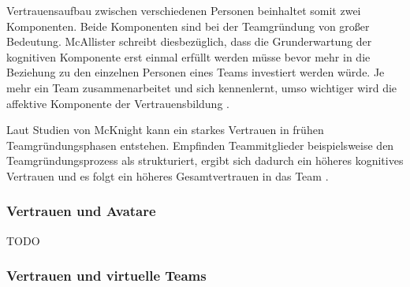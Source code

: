 \documentclass[a4paper,11pt]{article}%
\renewcommand{\\}{\vspace*{0.5\baselineskip} \newline}
\begin{document}
Vertrauensaufbau zwischen verschiedenen Personen beinhaltet somit zwei Komponenten. Beide Komponenten sind bei der Teamgründung von großer Bedeutung. 
McAllister schreibt diesbezüglich, dass die Grunderwartung der kognitiven Komponente erst einmal erfüllt werden müsse bevor mehr in die Beziehung zu den einzelnen Personen eines Teams investiert werden würde. Je mehr ein Team zusammenarbeitet und sich kennenlernt, umso wichtiger wird die affektive Komponente der Vertrauensbildung \citep[p.30]{mcallister1995affect}.

Laut Studien von McKnight kann ein starkes Vertrauen in frühen Teamgründungsphasen entstehen. Empfinden Teammitglieder beispielsweise den Teamgründungsprozess als strukturiert, ergibt sich dadurch ein höheres kognitives Vertrauen und es folgt ein höheres Gesamtvertrauen in das Team \citep[p.478-479]{mcknight1998initial}.




\subsubsection{Vertrauen und Avatare}
TODO
	\subsubsection{Vertrauen und virtuelle Teams}
	\label{Vertrauen und virtuelle Teams}
	
\end{document}
